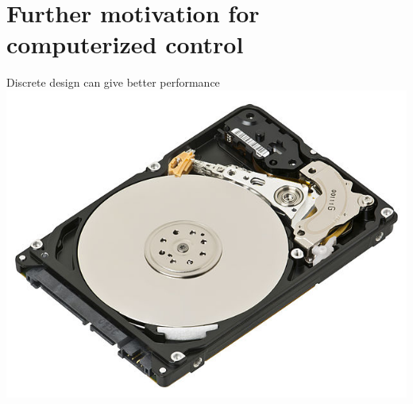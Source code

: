 \documentclass[presentation,aspectratio=169]{beamer}
\begin{document}
\section{Further motivation for computerized control}
\label{sec:org700aa5e}
\begin{frame}[label={sec:org6e443a9}]{Discrete design can give better performance}
\includegraphics[height=0.5\textheight]{../../figures/diskdrive.png}
\end{frame}
\end{document}

